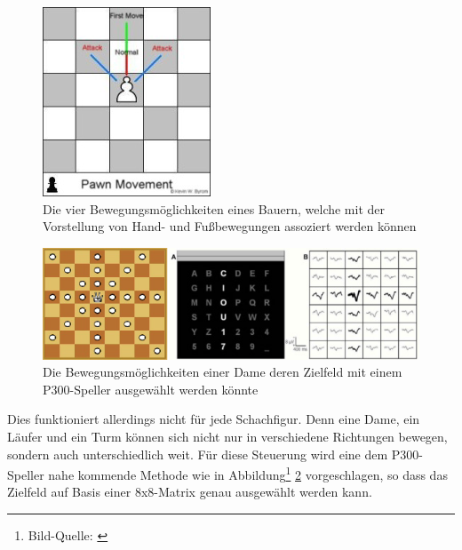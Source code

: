 \begin{figure}[h!]
\begin{center}
\includegraphics[scale=0.6]{images/ChessPawn.png}
\caption{Die vier Bewegungsmöglichkeiten eines Bauern, welche mit der Vorstellung von Hand- und Fußbewegungen assoziert werden können}
\label{ChessPawn}
\end{center}
\end{figure}

\begin{figure}[h!]
\begin{center}
\includegraphics[scale=0.7]{images/QueenControlExample.png}
\caption{Die Bewegungsmöglichkeiten einer Dame deren Zielfeld mit einem P300-Speller ausgewählt werden könnte}
\label{ChessQueen}
\end{center}
\end{figure}

Dies funktioniert allerdings nicht für jede Schachfigur.
Denn eine Dame, ein Läufer und ein Turm können sich nicht nur in verschiedene Richtungen bewegen, sondern auch unterschiedlich weit.
Für diese Steuerung wird eine dem P300-Speller nahe kommende Methode wie in Abbildung\footnote[2]{Bild-Quelle: \cite[S.5]{BCIChess}} \ref{ChessQueen} vorgeschlagen, so dass das Zielfeld auf Basis einer 8x8-Matrix genau ausgewählt werden kann.








\pagebreak
